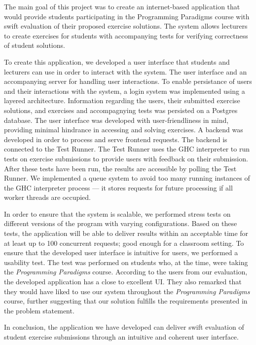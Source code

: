 The main goal of this project was to create an internet-based application that would provide students participating in the Programming Paradigms course with swift evaluation of their proposed exercise solutions.
The system allows lecturers to create exercises for students with accompanying tests for verifying correctness of student solutions.

To create this application, we developed a user interface that students and lecturers can use in order to interact with the system. The user interface and an accompanying server for handling user interactions.
To enable persistance of users and their interactions with the system, a login system was implemented using a layered architecture.
Information regarding the users, their submitted exercise solutions, and exercises and accompagnying tests was persisted on a Postgres database.
The user interface was developed with user-friendliness in mind, providing minimal hindrance in accessing and solving exercises.
A backend was developed in order to process and serve frontend requests.
The backend is connected to the Test Runner. The Test Runner uses the GHC interpreter to run tests on exercise submissions to provide users with feedback on their submission.
After these tests have been run, the results are accessible by polling the Test Runner.
We implemented a queue system to avoid too many running instances of the GHC interpreter process --- it stores requests for future processing if all worker threads are occupied.

In order to ensure that the system is scalable, we performed stress tests on different versions of the program with varying configurations.
Based on these tests, the application will be able to deliver results within an acceptable time for at least up to 100 concurrent requests; good enough for a classroom setting.
To ensure that the developed user interface is intuitive for users, we performed a usability test.
The test was performed on students who, at the time, were taking the \textit{Programming Paradigms} course.
According to the users from our evaluation, the developed application has a close to excellent UI.
They also remarked that they would have liked to use our system throughout the \textit{Programming Paradigms} course, further suggesting that our solution fulfills the requirements presented in the problem statement.

In conclusion, the application we have developed can deliver swift evaluation of student exercise submissions through an intuitive and coherent user interface.